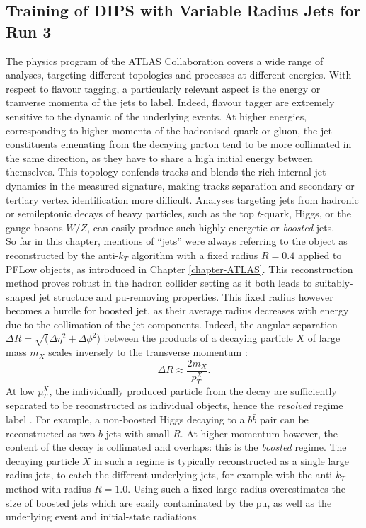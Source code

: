 \subsection{Training of DIPS with Variable Radius Jets for Run 3}\label{chapter:dipsVRtrain}
The physics program of the ATLAS Collaboration covers a wide range of analyses, targeting different topologies and processes at different energies. With respect to flavour tagging, a particularly relevant aspect is the energy or tranverse momenta of the jets to label. Indeed, flavour tagger are extremely sensitive to the dynamic of the underlying events. At higher energies, corresponding to higher momenta of the hadronised quark or gluon, the jet constituents emenating from the decaying parton tend to be more collimated in the same direction, as they have to share a high initial energy between themselves. This topology confends tracks and blends the rich internal jet dynamics in the measured signature, making tracks separation and secondary or tertiary vertex identification more difficult. Analyses targeting jets from hadronic or semileptonic decays of heavy particles, such as the top $t$-quark, Higgs, or the gauge bosons $W/Z$, can easily produce such highly energetic or \textit{boosted} jets.  \\

So far in this chapter, mentions of ``jets'' were always referring to the object as reconstructed by the anti-$k_T$ algorithm with a fixed radius $R = 0.4$ applied to PFLow objects, as introduced in Chapter \ref{chapter-ATLAS}. This reconstruction method proves robust in the hadron collider setting as it both leads to suitably-shaped jet structure and \gls{pu}-removing properties. This fixed radius however becomes a hurdle for boosted jet, as their average radius decreases with energy due to the collimation of the jet components. Indeed, the angular separation $\Delta R = \sqrt(\Delta\eta^2 + \Delta \phi^2)$ between the products of a decaying particle $X$ of large mass $m_X$ scales inversely to the transverse momentum \cite{ATLAS:largeRjet}: 
\begin{equation}\label{eq:sizeJet}
  \Delta R \approx \frac{2 m_X}{p_T^X}.
\end{equation}
At low $p_T^X$, the individually produced particle from the decay are sufficiently separated to be reconstructed as individual objects, hence the \textit{resolved} regime label \cite{ATLAS:2016hcf}. For example, a non-boosted Higgs decaying to a $b\bar{b}$ pair can be reconstructed as two $b$-jets with small $R$. At higher momentum however, the content of the decay is collimated and overlaps: this is the \textit{boosted} regime. The decaying particle $X$ in such a regime is typically reconstructed as a single large radius jets, to catch the different underlying jets, for example with the anti-$k_T$ method with radius $R = 1.0$. Using such a fixed large radius overestimates the size of boosted jets which are easily contaminated by the \gls{pu}, as well as the underlying event and initial-state radiations.  \\

